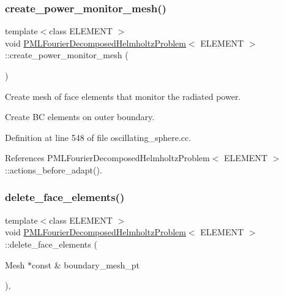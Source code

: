 \subsubsection{\texorpdfstring{create\+\_\+power\+\_\+monitor\+\_\+mesh()}{create\_power\_monitor\_mesh()}}
{\footnotesize\ttfamily template$<$class E\+L\+E\+M\+E\+NT $>$ \\
void \hyperlink{classPMLFourierDecomposedHelmholtzProblem}{P\+M\+L\+Fourier\+Decomposed\+Helmholtz\+Problem}$<$ E\+L\+E\+M\+E\+NT $>$\+::create\+\_\+power\+\_\+monitor\+\_\+mesh (\begin{DoxyParamCaption}{ }\end{DoxyParamCaption})}



Create mesh of face elements that monitor the radiated power. 

Create BC elements on outer boundary. 

Definition at line 548 of file oscillating\+\_\+sphere.\+cc.



References P\+M\+L\+Fourier\+Decomposed\+Helmholtz\+Problem$<$ E\+L\+E\+M\+E\+N\+T $>$\+::actions\+\_\+before\+\_\+adapt().

\mbox{\label{classPMLFourierDecomposedHelmholtzProblem_a4a9b767ba4beb7ab5db9c98fc46c49b2}} 
\subsubsection{\texorpdfstring{delete\+\_\+face\+\_\+elements()}{delete\_face\_elements()}}
{\footnotesize\ttfamily template$<$class E\+L\+E\+M\+E\+NT $>$ \\
void \hyperlink{classPMLFourierDecomposedHelmholtzProblem}{P\+M\+L\+Fourier\+Decomposed\+Helmholtz\+Problem}$<$ E\+L\+E\+M\+E\+NT $>$\+::delete\+\_\+face\+\_\+elements (\begin{DoxyParamCaption}\item[{Mesh $\ast$const \&}]{boundary\+\_\+mesh\+\_\+pt }\end{DoxyParamCaption})\hspace{0.3cm}{\ttfamily [inline]}, {\ttfamily [private]}}



